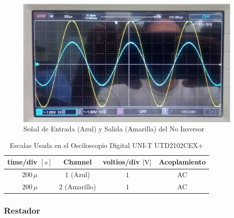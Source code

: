         \begin{figure}[H]
            \centering
            \renewcommand{\figurename}{Imagen}
            \includegraphics[width=15cm]{Imagenes/exp_noinversor.png}
            \caption{Señal de Entrada (Azul) y Salida (Amarilla) del No Inversor}
            \label{fig:exp_noinversor}
        \end{figure}
    
        \begin{table}[H]
            \centering
            \begin{tabular}{|c|c|c|c|}
                \hline
                \textbf{time/div} $[s]$ & \textbf{Channel} & \textbf{voltios/div $[\volt]$} & \textbf{Acoplamiento} \\ \hline
                $200 \, \mu$ & 1 (Azul) &   $1 $ & AC \\ \hline
                $200 \, \mu$ & 2 (Amarillo)  &   $1 $ & AC \\ \hline  
            \end{tabular}
            \caption{Escalas Usada en el Osciloscopio Digital UNI-T UTD2102CEX+}
            \label{tab:escala_noinversor}
        \end{table}

    \subsubsection{Restador}
        
